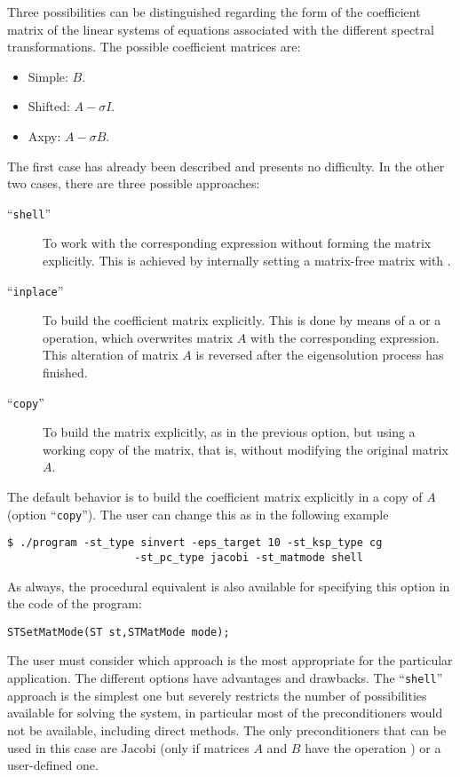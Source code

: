 	Three possibilities can be distinguished regarding the form of the coefficient matrix of the linear systems of equations associated with the different spectral transformations. The possible coefficient matrices are:
	\begin{itemize}
	\item Simple: $B$.
	\item Shifted: $A-\sigma I$.
	\item Axpy: $A-\sigma B$.
	\end{itemize}
	The first case has already been described and presents no difficulty. In the other two cases, there are three possible approaches:
	\begin{description}
	\item[``\Verb!shell!''] To work with the corresponding expression without forming the matrix explicitly. This is achieved by internally setting a matrix-free matrix with .
	\item[``\Verb!inplace!''] To build the coefficient matrix explicitly. This is done by means of a  or a  operation, which overwrites matrix $A$ with the corresponding expression. This alteration of matrix $A$ is reversed after the eigensolution process has finished.
	\item[``\Verb!copy!''] To build the matrix explicitly, as in the previous option, but using a working copy of the matrix, that is, without modifying the original matrix $A$.
	\end{description}
	The default behavior is to build the coefficient matrix explicitly in a copy of $A$ (option ``\Verb!copy!''). The user can change this as in the following example
\begin{Verbatim}[fontsize=\small]
	$ ./program -st_type sinvert -eps_target 10 -st_ksp_type cg
                    -st_pc_type jacobi -st_matmode shell
\end{Verbatim}
	As always, the procedural equivalent is also available for specifying this option in the code of the program:
	\begin{Verbatim}[fontsize=\small]
	STSetMatMode(ST st,STMatMode mode);
	\end{Verbatim}

	The user must consider which approach is the most appropriate for the particular application. The different options have advantages and drawbacks. The ``\Verb!shell!'' approach is the simplest one but severely restricts the number of possibilities available for solving the system, in particular most of the \petsc{} preconditioners would not be available, including direct methods. The only preconditioners that can be used in this case are Jacobi (only if matrices $A$ and $B$ have the operation ) or a user-defined one.
	
